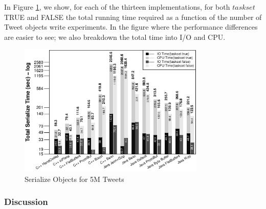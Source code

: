In Figure \ref{fig:exp_serialization_bar}, we show, for each of the thirteen implementations, for both $taskset$ TRUE and FALSE the total running time required as a function of the number of Tweet objects write experiments. In the figure where the
performance differences are easier to see; we also breakdown
the total time into I/O and CPU.
\begin{figure}
	\centering
	\includegraphics[width=\columnwidth,height=2.5in,keepaspectratio]{../../RScripts/Experiment_SerializeObjects_Bar.pdf}
	\caption{Serialize Objects for 5M Tweets}
	\label{fig:exp_serialization_bar}
\end{figure}

\subsubsection{Discussion}
